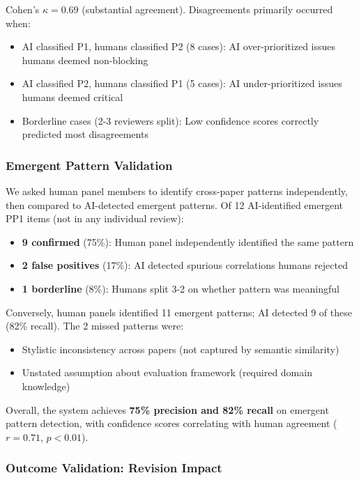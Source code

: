 Cohen's $\kappa = 0.69$ (substantial agreement). Disagreements primarily occurred when:
\begin{itemize}
\item AI classified P1, humans classified P2 (8 cases): AI over-prioritized issues humans deemed non-blocking
\item AI classified P2, humans classified P1 (5 cases): AI under-prioritized issues humans deemed critical
\item Borderline cases (2-3 reviewers split): Low confidence scores correctly predicted most disagreements
\end{itemize}

\subsubsection{Emergent Pattern Validation}

We asked human panel members to identify cross-paper patterns independently, then compared to AI-detected emergent patterns. Of 12 AI-identified emergent PP1 items (not in any individual review):
\begin{itemize}
\item \textbf{9 confirmed} (75\%): Human panel independently identified the same pattern
\item \textbf{2 false positives} (17\%): AI detected spurious correlations humans rejected
\item \textbf{1 borderline} (8\%): Humans split 3-2 on whether pattern was meaningful
\end{itemize}

Conversely, human panels identified 11 emergent patterns; AI detected 9 of these (82\% recall). The 2 missed patterns were:
\begin{itemize}
\item Stylistic inconsistency across papers (not captured by semantic similarity)
\item Unstated assumption about evaluation framework (required domain knowledge)
\end{itemize}

Overall, the system achieves \textbf{75\% precision and 82\% recall} on emergent pattern detection, with confidence scores correlating with human agreement ($r = 0.71$, $p < 0.01$).

\subsubsection{Outcome Validation: Revision Impact}

